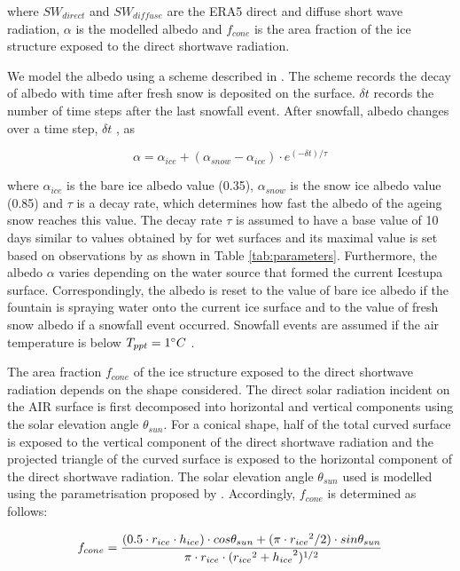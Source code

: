 \documentclass[utf8]{frontiersSCNS} %
\begin{document}
where $SW_{direct}$ and $SW_{diffuse}$ are the ERA5 direct and diffuse short wave radiation, $\alpha$ is the modelled
albedo and $f_{cone}$ is the area fraction of the ice structure exposed to the direct shortwave radiation.

We model the albedo using a scheme described in \cite{OerlemansKnap_1998}. The scheme records the decay of albedo with
time after fresh snow is deposited on the surface. $\delta t$ records the number of time steps after the last snowfall
event. After snowfall, albedo changes over a time step, $\delta t$ , as

\begin{equation} \alpha=\alpha_{ice}+(\alpha_{snow}-\alpha_{ice}) \cdot e^{(-\delta t)/\tau} \label{eqn:a}
\end{equation}

where $\alpha_{ice}$ is the bare ice albedo value (0.35), $\alpha_{snow}$ is the snow ice albedo value (0.85) and
$\tau$ is a decay rate, which determines how fast the albedo of the ageing snow reaches this value.  The decay rate
$\tau$ is assumed to have a base value of 10 days similar to values obtained by \cite{Schmidt_2017} for wet surfaces
and its maximal value is set based on observations by \cite{OerlemansKnap_1998} as shown in Table
\ref{tab:parameters}.  Furthermore, the albedo $\alpha$ varies depending on the water source that formed the current
Icestupa surface.  Correspondingly, the albedo is reset to the value of bare ice albedo if the fountain is spraying
water onto the current ice surface and to the value of fresh snow albedo if a snowfall event occurred. Snowfall events
are assumed if the air temperature is below $T_{ppt}=1 \degree C$ \citep{FujitaAgeta_2000}.

The area fraction $f_{cone}$ of the ice structure exposed to the direct shortwave radiation depends on the shape
considered. The direct solar radiation incident on the AIR surface is first decomposed into horizontal and vertical
components using the solar elevation angle $\theta_{sun}$. For a conical shape, half of the total curved surface is
exposed to the vertical component of the direct shortwave radiation and the projected triangle of the curved surface is
exposed to the horizontal component of the direct shortwave radiation. The solar elevation angle $\theta_{sun}$ used is
modelled using the parametrisation proposed by \cite{Woolf_1968}. Accordingly, $f_{cone}$ is determined as follows:

\begin{equation} \begin{split} f_{cone}& =\frac{(0.5 \cdot r_{ice} \cdot h_{ice}) \cdot cos \theta_{sun} +(\pi \cdot
{r_{ice}}^2/2) \cdot sin \theta_{sun} }{\pi \cdot r_{ice} \cdot ({r_{ice}}^2+{h_{ice}}^2)^{1/2}}\\ \end{split}
\label{eqn:f_{cone}} \end{equation}
\end{document}
